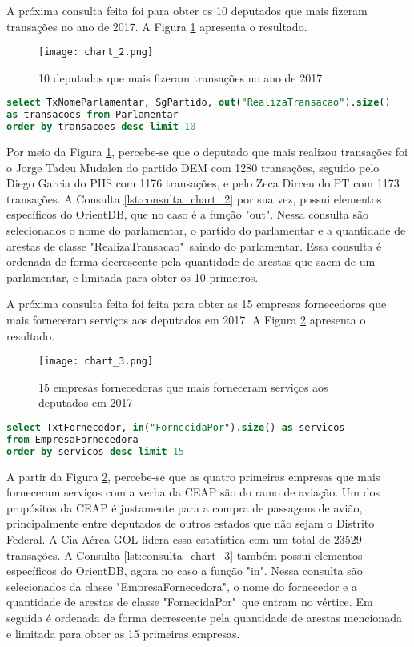 A próxima consulta feita foi para obter os 10 deputados que mais fizeram transações no ano de 2017. A Figura \ref{fig:chart_2} apresenta o resultado.

\begin{figure}[H]
\centering
\texttt{[image: chart\_2.png]}
\caption{10 deputados que mais fizeram transações no ano de 2017}
\label{fig:chart_2}
\end{figure}

\begin{lstlisting}[label={lst:consulta_chart_2}, caption={Consulta para o gráfico \ref{fig:chart_2}},captionpos=b, language=sql]
select TxNomeParlamentar, SgPartido, out("RealizaTransacao").size() 
as transacoes from Parlamentar 
order by transacoes desc limit 10
\end{lstlisting}

Por meio da Figura \ref{fig:chart_2}, percebe-se que o deputado que mais realizou transações foi o Jorge Tadeu Mudalen do partido DEM com 1280 transações, seguido pelo Diego Garcia do PHS com 1176 transações, e pelo Zeca Dirceu do PT com 1173 transações. A Consulta \ref{lst:consulta_chart_2} por sua vez, possui elementos específicos do OrientDB, que no caso é a função "out". Nessa consulta são selecionados o nome do parlamentar, o partido do parlamentar e a quantidade de arestas de classe "RealizaTransacao"\ saindo do parlamentar. Essa consulta é ordenada de forma decrescente pela quantidade de arestas que saem de um parlamentar, e limitada para obter os 10 primeiros.

A próxima consulta feita foi feita para obter as 15 empresas fornecedoras que mais forneceram serviços aos deputados em 2017. A Figura \ref{fig:chart_3} apresenta o resultado.

\begin{figure}[H]
\centering
\texttt{[image: chart\_3.png]}
\caption{15 empresas fornecedoras que mais forneceram serviços aos deputados em 2017}
\label{fig:chart_3}
\end{figure}

\begin{lstlisting}[label={lst:consulta_chart_3}, caption={Consulta para a Figura \ref{fig:chart_3}},captionpos=b, language=sql]
select TxtFornecedor, in("FornecidaPor").size() as servicos 
from EmpresaFornecedora 
order by servicos desc limit 15
\end{lstlisting}

A partir da Figura \ref{fig:chart_3}, percebe-se que as quatro primeiras empresas que mais forneceram serviços com a verba da CEAP são do ramo de aviação. Um dos propósitos da CEAP é justamente para a compra de passagens de avião, principalmente entre deputados de outros estados que não sejam o Distrito Federal. A Cia Aérea GOL lidera essa estatística com um total de 23529 transações. A Consulta \ref{lst:consulta_chart_3} também possui elementos específicos do OrientDB, agora no caso a função "in". Nessa consulta são selecionados da classe "EmpresaFornecedora", o nome do fornecedor e a quantidade de arestas de classe "FornecidaPor"\ que entram no vértice. Em seguida é ordenada de forma decrescente pela quantidade de arestas mencionada e limitada para obter as 15 primeiras empresas.

